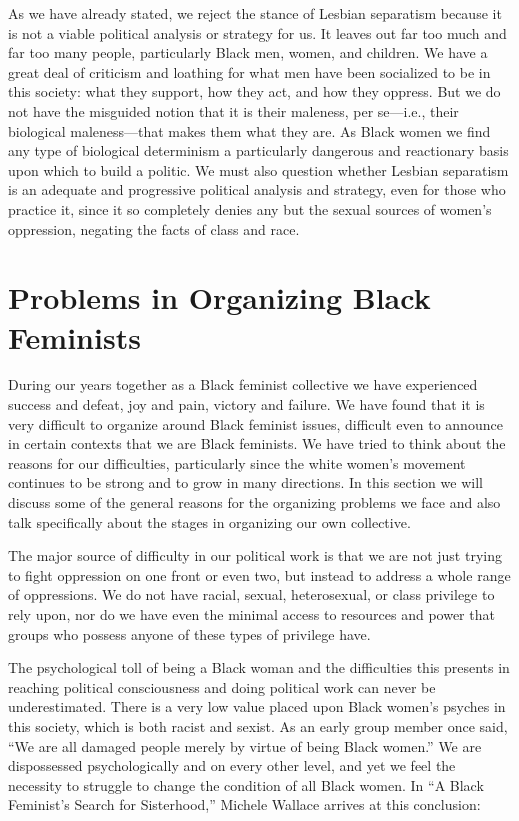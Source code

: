 \documentclass{article}
\begin{document}
As we have already stated, we reject the stance of Lesbian separatism because
it is not a viable political analysis or strategy for us. It leaves out far too
much and far too many people, particularly Black men, women, and children. We
have a great deal of criticism and loathing for what men have been socialized
to be in this society: what they support, how they act, and how they oppress.
But we do not have the misguided notion that it is their maleness, per se—i.e.,
their biological maleness—that makes them what they are. As Black women we find
any type of biological determinism a particularly dangerous and reactionary
basis upon which to build a politic. We must also question whether Lesbian
separatism is an adequate and progressive political analysis and strategy, even
for those who practice it, since it so completely denies any but the sexual
sources of women's oppression, negating the facts of class and race.

\section{Problems in Organizing Black Feminists}

During our years together as a Black feminist collective we have experienced
success and defeat, joy and pain, victory and failure. We have found that it is
very difficult to organize around Black feminist issues, difficult even to
announce in certain contexts that we are Black feminists. We have tried to
think about the reasons for our difficulties, particularly since the white
women's movement continues to be strong and to grow in many directions. In this
section we will discuss some of the general reasons for the organizing problems
we face and also talk specifically about the stages in organizing our own
collective.

The major source of difficulty in our political work is that we are not just
trying to fight oppression on one front or even two, but instead to address a
whole range of oppressions. We do not have racial, sexual, heterosexual, or
class privilege to rely upon, nor do we have even the minimal access to
resources and power that groups who possess anyone of these types of privilege
have.

The psychological toll of being a Black woman and the difficulties this
presents in reaching political consciousness and doing political work can never
be underestimated. There is a very low value placed upon Black women's psyches
in this society, which is both racist and sexist. As an early group member once
said, ``We are all damaged people merely by virtue of being Black women.'' We
are dispossessed psychologically and on every other level, and yet we feel the
necessity to struggle to change the condition of all Black women. In ``A Black
Feminist's Search for Sisterhood,'' Michele Wallace arrives at this conclusion:
\end{document}
